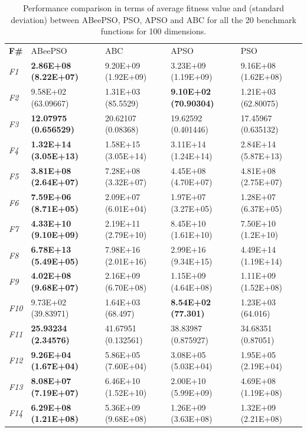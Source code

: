 \begin{table}[!h]
\caption{\small{Performance comparison in terms of average fitness value and (standard deviation) between ABeePSO, PSO, APSO and ABC for all the 20 benchmark functions for 100 dimensions.}}
\label{tab:Comparison_100D}
\begin{center}
\begin{tabular}{p{0.5cm}|p{2.5cm}|p{2.5cm}|p{2.5cm}|p{2.5cm}}
\hline\noalign{\smallskip}
\textbf{F\#}	& ABeePSO & ABC & APSO & PSO    \\		
\noalign{\smallskip}
\hline
\noalign{\smallskip}
\textit{F1}  & \textbf{2.86E+08 (8.22E+07)} & 9.20E+09 (1.92E+09) & 3.23E+09 (1.19E+09) & 9.16E+08 (1.62E+08)\\
\textit{F2}  & 9.58E+02 (63.09667) & 1.31E+03 (85.5529) & \textbf{9.10E+02 (70.90304)} & 1.21E+03 (62.80075)\\
\textit{F3}  & \textbf{12.07975 (0.656529)} & 20.62107 (0.08368) & 19.62592 (0.401446) & 17.45967 (0.635132)\\
\textit{F4}  & \textbf{1.32E+14 (3.05E+13)} & 1.58E+15 (3.05E+14) & 3.11E+14 (1.24E+14) & 2.84E+14 (5.87E+13)\\
\textit{F5}  & \textbf{3.81E+08 (2.64E+07)} & 7.28E+08 (3.32E+07) & 4.45E+08 (4.70E+07) & 4.81E+08 (2.75E+07)\\
\textit{F6}  & \textbf{7.59E+06 (8.71E+05)} & 2.09E+07 (6.01E+04) & 1.97E+07 (3.27E+05) & 1.28E+07 (6.37E+05)\\
\textit{F7}  & \textbf{4.33E+10 (9.10E+09)} & 2.19E+11 (2.79E+10) & 8.45E+10 (1.61E+10) & 7.50E+10 (1.2E+10)\\
\textit{F8}  & \textbf{6.78E+13 (5.49E+05)} & 7.98E+16 (2.01E+16) & 2.99E+16 (9.34E+15) & 4.49E+14 (1.19E+14)\\
\textit{F9}  & \textbf{4.02E+08 (9.68E+07)} & 2.16E+09 (6.70E+08) & 1.15E+09 (4.64E+08) & 1.11E+09 (1.52E+08)\\
\textit{F10} & 9.73E+02 (39.83971) & 1.64E+03 (68.497) & \textbf{8.54E+02 (77.301)} & 1.23E+03 (64.016)\\
\textit{F11} & \textbf{25.93234 (2.34576)} & 41.67951 (0.132561) & 38.83987 (0.875927) & 34.68351 (0.87051)\\
\textit{F12} & \textbf{9.26E+04 (1.67E+04)} & 5.86E+05 (7.60E+04) & 3.08E+05 (5.03E+04) & 1.95E+05 (2.19E+04)\\
\textit{F13} & \textbf{8.08E+07 (7.19E+07)} & 6.46E+10 (1.52E+10) & 2.00E+10 (5.99E+09) & 4.69E+08 (1.19E+08)\\
\textit{F14} & \textbf{6.29E+08 (1.21E+08)} & 5.36E+09 (9.68E+08) & 1.26E+09 (3.63E+08) & 1.32E+09 (2.21E+08)\\

\end{tabular}
\end{center}
\end{table}
